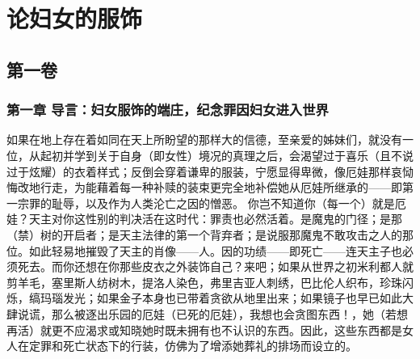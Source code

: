 
\chapter{论妇女的服饰}



\section{第一卷}


\subsection{第一章 导言：妇女服饰的端庄，纪念罪因妇女进入世界}

如果在地上存在着如同在天上所盼望的那样大的信德，至亲爱的姊妹们，就没有一位，从起初并学到关于自身（即女性）境况的真理之后，会渴望过于喜乐（且不说过于炫耀）的衣着样式；反倒会穿着谦卑的服装，宁愿显得卑微，像厄娃那样哀恸悔改地行走，为能藉着每一种补赎的装束更完全地补偿她从厄娃所继承的——即第一宗罪的耻辱，以及作为人类沦亡之因的憎恶。 你岂不知道你（每一个）就是厄娃？天主对你这性别的判决活在这时代：罪责也必然活着。是魔鬼的门径；是那（禁）树的开启者；是天主法律的第一个背弃者；是说服那魔鬼不敢攻击之人的那位。如此轻易地摧毁了天主的肖像——人。因的功绩——即死亡——连天主子也必须死去。而你还想在你那些皮衣之外装饰自己？来吧；如果从世界之初米利都人就剪羊毛，塞里斯人纺树木，提洛人染色，弗里吉亚人刺绣，巴比伦人织布，珍珠闪烁，缟玛瑙发光；如果金子本身也已带着贪欲从地里出来；如果镜子也早已如此大肆说谎，那么被逐出乐园的厄娃（已死的厄娃），我想也会贪图东西！，她（若想再活）就更不应渴求或知晓她时既未拥有也不认识的东西。因此，这些东西都是女人在定罪和死亡状态下的行装，仿佛为了增添她葬礼的排场而设立的。\par


